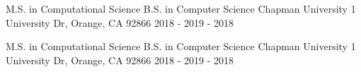 

\begin{cventries}

  \cventry
    {M.S. in Computational Science \linebreak B.S. in Computer Science} %
    {Chapman University} %
    {1 University Dr, Orange, CA 92866} %
    {2018 - 2019  - 2018} %
    {
    }
    
      \cventry
    {M.S. in Computational Science \linebreak B.S. in Computer Science} %
    {Chapman University} %
    {1 University Dr, Orange, CA 92866} %
    {2018 - 2019  - 2018} %
    {
    }
\vspace{-0.7cm}
\end{cventries}

